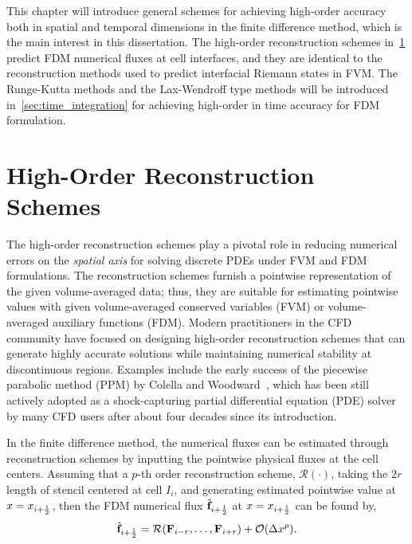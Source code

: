 This chapter will introduce general schemes for achieving high-order accuracy
both in spatial and temporal dimensions in the finite difference method, which is the main interest in this dissertation.
The high-order reconstruction schemes in~\cref{sec:recons} predict FDM numerical fluxes at cell interfaces,
and they are identical to the reconstruction methods used to predict interfacial Riemann states in FVM\@.
The Runge-Kutta methods and the Lax-Wendroff type methods will be introduced in~\cref{sec:time_integration}
for achieving high-order in time accuracy for FDM formulation.


\section{High-Order Reconstruction Schemes}\label{sec:recons}

The high-order reconstruction schemes play a pivotal role in reducing numerical errors
on the \textit{spatial axis} for solving discrete PDEs under FVM and FDM formulations.
The reconstruction schemes furnish a pointwise representation of the given volume-averaged data;
thus, they are suitable for estimating pointwise values with given volume-averaged conserved variables (FVM) or
volume-averaged auxiliary functions (FDM).
Modern practitioners in the CFD community have focused on designing high-order reconstruction schemes
that can generate highly accurate solutions while maintaining numerical stability at discontinuous regions.
Examples include the early success of the piecewise parabolic method (PPM) by Colella and Woodward~\cite{colella1984piecewise},
which has been still actively adopted as a shock-capturing partial differential equation (PDE) solver
by many CFD users after about four decades since its introduction.

In the finite difference method, the numerical fluxes can be estimated through reconstruction schemes
by inputting the pointwise physical fluxes at the cell centers.
Assuming that a \( p \)-th order reconstruction scheme, \( \mathcal{R}(\cdot) \), taking the \( 2r \) length of stencil
centered at cell \( I_{i} \), and generating estimated pointwise value at \( x = x_{{i+\frac{1}{2}}} \),
then the FDM numerical flux \( \hat{\mathbf{f}}_{{i+\frac{1}{2}}} \) at \( x = x_{{i+\frac{1}{2}}} \) can be found by,
\begin{equation}\label{eq:fdm_recon_1d}
    \hat{\mathbf{f}}_{{i+\frac{1}{2}}} = \mathcal{R}(\mathbf{F}_{i-r}, \dots, \mathbf{F}_{i+r}) + \mathcal{O}(\Delta x^{p}).
\end{equation}

